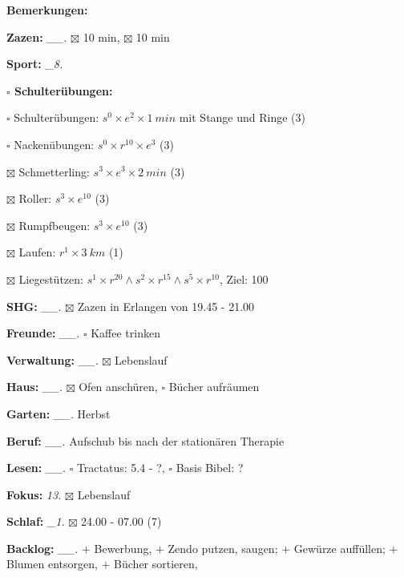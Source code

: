 \documentclass[10pt,a4paper]{article}
\newcommand\prop[1] {{\color {alizarin} {\bf #1}}}        %
\newcommand\mand[1] {{\color {burntorange} {\bf #1}}}     %
\newcommand\topspace{\vskip -15pt \hskip 20pt}
\newcommand\bottomspace{\vskip 4pt}
\newcommand\n[1] { {\sl #1.} \hskip 5pt }
\begin{document}
\begin{mdframed}[style=daystyle]
\begin{labeling}{{\mand {Bemerkungen:}}}
  \item[{\mand {Zazen:}}]        \n{\_\_} $\boxtimes$ 10 min, $\boxtimes$ 10 min
  \item[{\mand {Sport:}}]         \n{\_8}
    \topspace
    \begin{minipage}{0.75\textwidth}  
      \begin{labeling}{\prop {$\square$ {Schulterübungen:}}} 
        \setlength\itemsep{-3pt}
      \item[$\square$ Schulterübungen:] $s^0 \times e^2 \times 1\ min$ mit Stange und Ringe (3)
      \item[$\square$ Nackenübungen:]   $s^0 \times r^{10} \times e^3$ (3)
      \item[$\boxtimes$ Schmetterling:]   $s^3 \times e^3 \times 2\ min$ (3)
      \item[$\boxtimes$ Roller:]          $s^3 \times e^{10}$ (3)
      \item[$\boxtimes$ Rumpfbeugen:]     $s^3 \times e^{10}$ (3)
      \item[$\boxtimes$ Laufen:]          $r^1 \times 3\ km$ (1)
      \item[$\boxtimes$ Liegestützen:]    $s^1 \times r^{20} \land s^2 \times r^{15} \land s^5 \times r^{10}$,
          Ziel: 100
      \end{labeling}
    \end{minipage}
    \bottomspace        
  \item[{\mand {SHG:}}]          \n{\_\_} $\boxtimes$ Zazen in Erlangen von 19.45 - 21.00
  \item[{\mand {Freunde:}}]      \n{\_\_} $\square$ Kaffee trinken
  \item[{\mand {Verwaltung:}}]   \n{\_\_} $\boxtimes$ Lebenslauf
  \item[{\mand {Haus:}}]         \n{\_\_} $\boxtimes$ Ofen anschüren, $\square$ Bücher aufräumen
  \item[{\mand {Garten:}}]       \n{\_\_} Herbst
  \item[{\mand {Beruf:}}]        \n{\_\_} Aufschub bis nach der stationären Therapie
  \item[{\mand {Lesen:}}]        \n{\_\_} $\square$ Tractatus: 5.4 - ?, $\square$ Basis Bibel: ?
  \item[{\mand {Fokus:}}]          \n{13} $\boxtimes$ Lebenslauf
  \item[{\mand {Schlaf:}}]        \n{\_1} $\boxtimes$ 24.00 - 07.00 (7)
  \item[{\mand {Backlog:}}]      \n{\_\_} 
    $+$ Bewerbung,
    $+$ Zendo putzen, saugen; $+$ Gewürze auffüllen; $+$ Blumen entsorgen, $+$ Bücher sortieren,

\end{labeling}
\end{mdframed}
\end{document}
